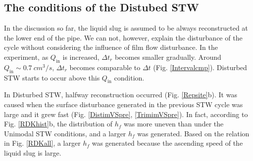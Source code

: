 \documentclass[aps,pre,preprint,groupedaddress,showkeys]{revtex4-2}
\begin{document}
\subsection{The conditions of the Distubed STW}
In the discussion so far, the liquid slug is assumed to be always reconstructed at the lower end of the pipe.
We can not, however, explain the disturbance of the cycle without considering the influence of film flow disturbance.
In the experiment, as $ Q_ \mathrm {in} $ is increased, $ \Delta t_r $ becomes smaller gradually. 
Around $ Q_ \mathrm{in} \sim \SI{0.7}{cm^ 3 / s}$, $ \Delta t_r $ becomes comparable to $\Delta t$ (Fig. \ref{Intervalcmp}).
Disturbed STW starts to occur above this $ Q_ \mathrm {in} $ condition.

In Disturbed STW, halfway reconstruction occurred (Fig. \ref{Repsite}b).
It was caused when the surface disturbance generated in the previous STW cycle was large and it grew fast (Fig. \ref{DistimVSpre}, \ref{TrimimVSpre}).
In fact, according to Fig. \ref{RDKhist}b, the distribution of $ h_f $ was more uneven than under the Unimodal STW conditions, and a larger $ h_f $ was generated.
Based on the relation in Fig. \ref{RDKall}, a larger $h_f$ was generated because the ascending speed of the liquid slug is large.
\end{document}
